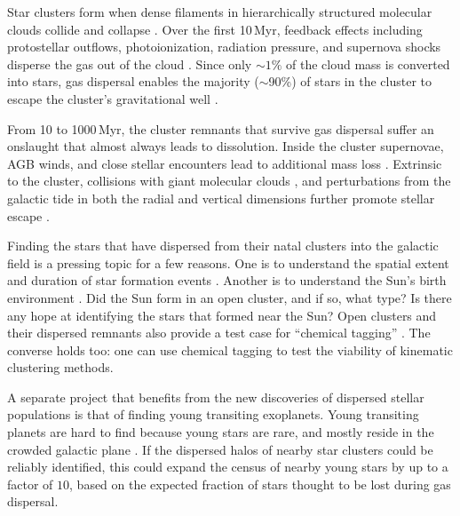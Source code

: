 \documentclass[12pt,twocolumn,tighten]{aastex63}
\begin{document}
Star clusters form when dense filaments in hierarchically structured
molecular clouds collide and collapse \citep{shu_star_1987}.  Over the
first 10\,Myr, feedback effects including protostellar outflows,
photoionization, radiation pressure, and supernova shocks disperse the
gas out of the cloud \citep{krumholz_star_2019}.  Since only
$\sim$$1\%$ of the cloud mass is converted into stars, gas dispersal
enables the majority ($\sim$90\%) of stars in the cluster to escape
the cluster's gravitational well \citep{lada_embedded_2003}.

From 10 to 1000\,Myr, the cluster remnants that survive gas dispersal
suffer an onslaught that almost always leads to dissolution.  Inside
the cluster supernovae, AGB winds, and close stellar encounters lead
to additional mass loss \citep{lamers_mass_loss_2010}.  Extrinsic to
the cluster, collisions with giant molecular clouds
\citep{spitzer_disruption_1958}, and perturbations from the galactic
tide in both the radial and vertical dimensions further promote
stellar escape \citep[{\it
e.g.},][]{fukushige_timescale_2000,bergond_gravitational_2001}.

Finding the stars that have dispersed from their natal clusters into
the galactic field is a pressing topic for a few reasons.  One is to
understand the spatial extent and duration of star formation events
\citep[{\it e.g.},][]{wright_kinematics_2018}.  Another is to
understand the Sun's birth environment \citep{adams_birth_2010}.  Did
the Sun form in an open cluster, and if so, what type? Is there any
hope at identifying the stars that formed near the Sun?  Open clusters
and their dispersed remnants also provide a test case for ``chemical
tagging'' \citep[{\it
e.g.},][]{freeman_new_2002,hogg_chemical_2016,ness_dopplergangers_2018}.
The converse holds too: one can use chemical tagging to test the
viability of kinematic clustering methods.

A separate project that benefits from the new discoveries of dispersed
stellar populations is that of finding young transiting exoplanets.
Young transiting planets are hard to find because young stars are
rare, and mostly reside in the crowded galactic plane \citep[see {\it
e.g.},][]{Kharchenko_et_al_2013,piskunov_global_2018}.  If the
dispersed halos of nearby star clusters could be reliably identified,
this could expand the census of nearby young stars by up to a factor
of $10$, based on the expected fraction of stars thought to be lost
during gas dispersal.
\end{document}
